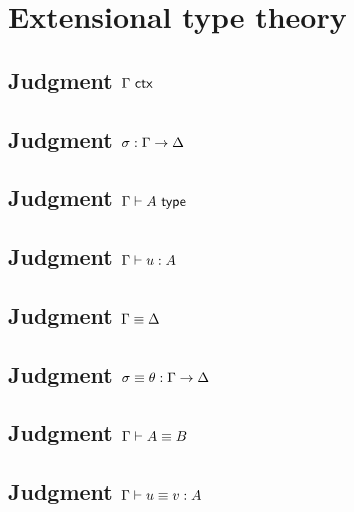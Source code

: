 \documentclass{article}
\begin{document}



\section*{Extensional type theory}
\label{sec:extensional-type-theory}

\subsection*{Judgment $\Gamma\ \mathsf{ctx}$}

\showEttIsctxRules

\subsection*{Judgment $\sigma : \Gamma \to \Delta$}

\showEttIssubstRules

\subsection*{Judgment $\Gamma \vdash A \ \mathsf{type}$}

\showEttIstypeRules

\subsection*{Judgment $\Gamma \vdash u : A$}

\showEttIstermRules

\subsection*{Judgment $\Gamma \equiv \Delta$}

\showEttEqctxRules

\subsection*{Judgment $\sigma \equiv \theta : \Gamma \to \Delta$}

\showEttEqsubstRules

\subsection*{Judgment $\Gamma \vdash A \equiv B$}

\showEttEqtypeRules

\subsection*{Judgment $\Gamma \vdash u \equiv v : A$}
\end{document}
